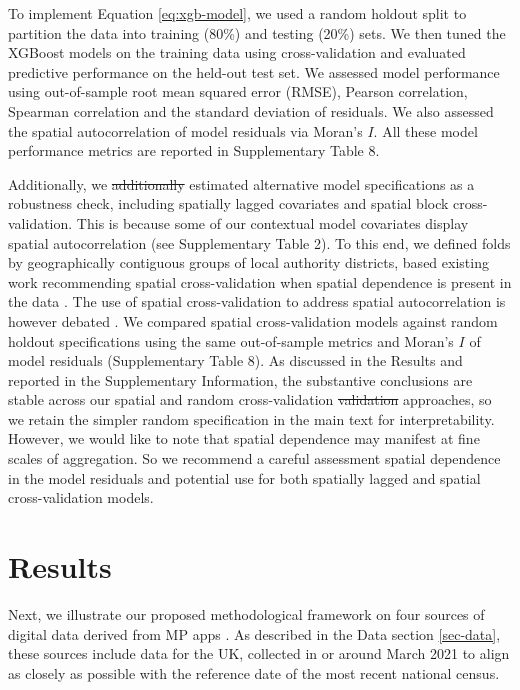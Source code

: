 \documentclass[]{rsos}%
\providecommand{\DIFadd}[1]{{\protect\color{blue}\uwave{#1}}} %
\providecommand{\DIFdel}[1]{{\protect\color{red}\sout{#1}}}                      %
\providecommand{\DIFaddbegin}{} %
\providecommand{\DIFaddend}{} %
\providecommand{\DIFdelbegin}{} %
\providecommand{\DIFdelend}{} %
\begin{document}
To implement Equation \ref{eq:xgb-model}, we used a random holdout split
to partition the data into training (80\%) and testing (20\%) sets. We
then tuned the XGBoost models on the training data using
cross-validation and evaluated predictive performance on the held-out
test set. We assessed model performance using out-of-sample root mean
squared error (RMSE), Pearson correlation, Spearman correlation and the
standard deviation of residuals. We also assessed the spatial
autocorrelation of model residuals via Moran's \(I\). All these model
performance metrics are reported in Supplementary Table 8.

Additionally, we \DIFdelbegin \DIFdel{additionally }\DIFdelend estimated alternative model specifications
as a robustness check, including spatially lagged covariates and spatial
block cross-validation. This is because some of our contextual model
covariates display spatial autocorrelation (see Supplementary Table 2).
To this end, we defined folds by geographically contiguous groups of
local authority districts, based \DIFaddbegin \DIFadd{on }\DIFaddend existing work recommending spatial
cross-validation when spatial dependence is present in the data
\citep{roberts17}. The use of spatial cross-validation to address spatial
autocorrelation is however debated \citep{Wadoux21}. We compared spatial
cross-validation models against random holdout specifications using the
same out-of-sample metrics and Moran's \(I\) of model residuals
(Supplementary Table 8). As discussed in the Results and reported in the
Supplementary Information, the substantive conclusions are stable across
our spatial and random cross-validation \DIFdelbegin \DIFdel{validation }\DIFdelend approaches, so we
retain the simpler random specification in the main text for
interpretability. However, we would like to note that spatial dependence
may manifest at fine scales of aggregation. So we recommend a careful
assessment \DIFaddbegin \DIFadd{of }\DIFaddend spatial dependence in the model residuals and potential use
for both spatially lagged and spatial cross-validation models.

\section{Results}\label{results}

Next, we illustrate our proposed methodological framework on four
sources of digital data derived from MP apps . As described in the Data
section \ref{sec-data}, these sources include data for the UK,
collected in or around March 2021 to align as closely as possible with
the reference date of the most recent national census.
\end{document}
